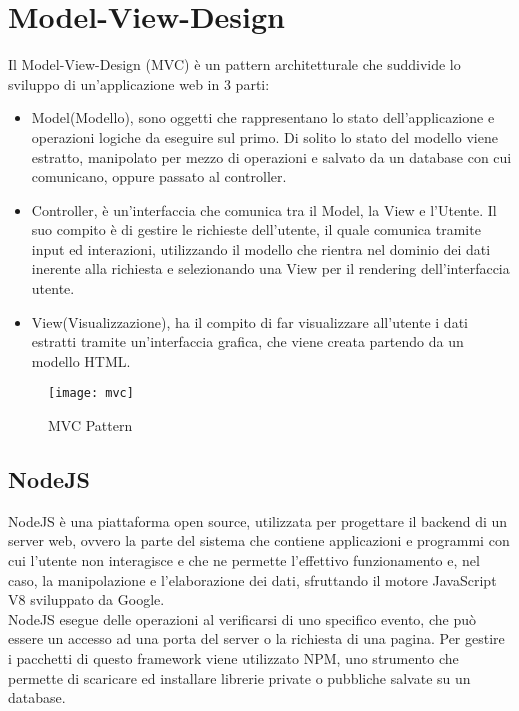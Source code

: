 \section{Model-View-Design}
Il Model-View-Design (MVC) \`e un pattern architetturale che suddivide lo sviluppo di un'applicazione web in 3 parti:
\begin{itemize}
\item Model(Modello), sono oggetti che rappresentano lo stato dell'applicazione e operazioni logiche da eseguire sul primo. Di solito
lo stato del modello viene estratto, manipolato per mezzo di operazioni e salvato da un database con cui comunicano,
oppure passato al controller.
\item Controller, \`e un'interfaccia che comunica tra il Model, la View e l'Utente. Il suo compito \`e di gestire le richieste dell'utente,
il quale comunica tramite input ed interazioni, utilizzando il modello che rientra nel dominio
dei dati inerente alla richiesta e selezionando una View per il rendering dell'interfaccia utente.
\item View(Visualizzazione), ha il compito di far visualizzare all'utente i dati estratti tramite un'interfaccia grafica, che viene creata
partendo da un modello HTML.\\[2\baselineskip]
\end{itemize}
\begin{figure}[H]
    \texttt{[image: mvc]}
    \caption{MVC Pattern}
\end{figure}
\fi

\subsection{NodeJS}
NodeJS \`e una piattaforma open source, utilizzata per progettare il backend di un server web, ovvero
la parte del sistema che contiene applicazioni e programmi con cui l'utente non interagisce e
che ne permette l'effettivo funzionamento e, nel caso, la manipolazione e l'elaborazione
dei dati, sfruttando il motore JavaScript V8 sviluppato da Google.\\
NodeJS esegue delle operazioni al verificarsi di uno specifico evento, che pu\`o essere un accesso ad una porta
del server o la richiesta di una pagina.
Per gestire i pacchetti di questo framework viene utilizzato NPM\cite{NPM}, uno strumento che permette
di scaricare ed installare librerie private o pubbliche salvate su un database.
\\[1\baselineskip]

